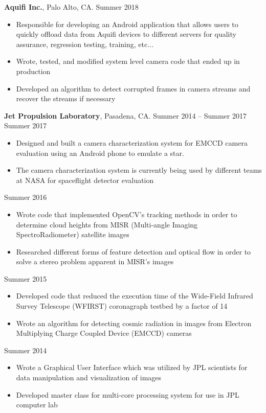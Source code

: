 \documentclass[mm,line]{res}
\newcommand\tab[1][1cm]{\hspace*{#1}}
\begin{document}
\begin{resume}
{\bf Aquifi Inc.}, Palo Alto, CA.  \hfill{Summer 2018}\\
\tab[4mm]{\em Software Architecture Intern}\hfill 
\begin{itemize} %
	\item 	Responsible for developing an Android application that allows users to quickly offload data from Aquifi devices to different servers for quality assurance, regression testing, training, etc...
	\item Wrote, tested, and modified system level camera code that ended up in production
	\item Developed an algorithm to detect corrupted frames in camera streams and recover the streams if necessary 
\end{itemize}
{\bf Jet Propulsion Laboratory}, Pasadena, CA. \hfill{Summer 2014 -- Summer 2017}\\
\tab[4mm]{\em Software and Hardware Testbed Development Intern}\hfill {Summer 2017}
\begin{itemize} %
\item 	Designed and built a camera characterization system for EMCCD camera evaluation using an Android phone to emulate a star.
\item 	The camera characterization system is currently being used by different teams at NASA for spaceflight detector evaluation 
\end{itemize}
\tab[4mm]{\em Computer Vision Intern}\hfill {Summer 2016}
\begin{itemize} %
\item  	Wrote code that implemented OpenCV's tracking methods in order to determine cloud heights from MISR (Multi-angle Imaging SpectroRadiometer) satellite images  
\item 	Researched different forms of feature detection and optical flow in order to solve a stereo problem apparent in MISR’s images 
\end{itemize}
\newpage
\tab[4mm]{\em Software and Hardware Intern for Optical Systems}\hfill {Summer 2015}
\begin{itemize} %
\item 	Developed code that reduced the execution time of the Wide-Field Infrared Survey Telescope (WFIRST) coronagraph testbed by a factor of 14
\item 	Wrote an algorithm for detecting cosmic radiation in images from Electron Multiplying Charge Coupled Device (EMCCD) cameras 
\end{itemize}
\tab[4mm]{\em  Software Intern}\hfill {Summer 2014}
\begin{itemize} %
\item 	Wrote a Graphical User Interface which was utilized by JPL scientists for data manipulation and visualization of images 
\item 	Developed master class for multi-core processing system for use in JPL computer lab 
\end{itemize}



\end{resume}
\end{document}
